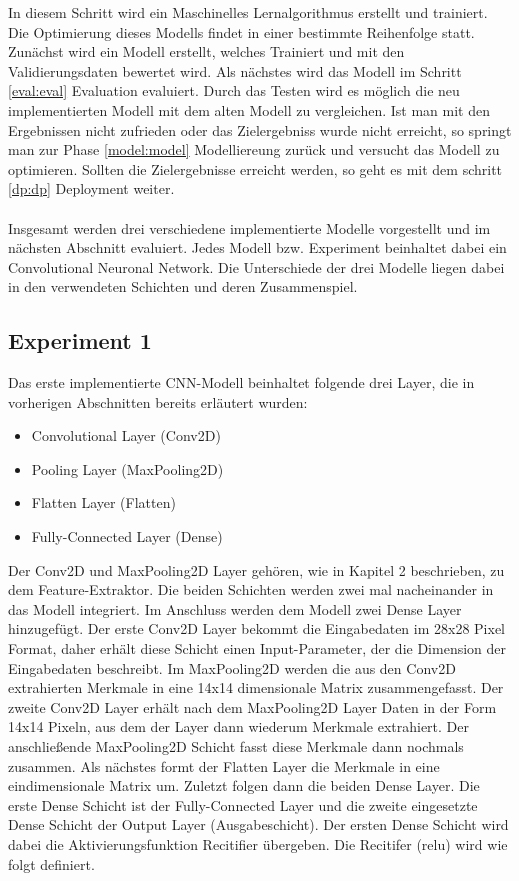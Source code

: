 \documentclass[12pt]{scrreprt}
\begin{document}
In diesem Schritt wird ein Maschinelles Lernalgorithmus erstellt und trainiert. Die Optimierung dieses Modells findet in einer bestimmte Reihenfolge statt. Zunächst wird ein Modell erstellt, welches Trainiert und mit den Validierungsdaten bewertet wird. Als nächstes wird das Modell im Schritt \ref{eval:eval} Evaluation evaluiert. Durch das Testen wird es möglich die neu implementierten Modell mit dem alten Modell zu vergleichen. Ist man mit den Ergebnissen nicht zufrieden oder das Zielergebniss wurde nicht erreicht, so springt man zur Phase \ref{model:model} Modelliereung zurück und versucht das Modell zu optimieren. Sollten die Zielergebnisse erreicht werden, so geht es mit dem schritt \ref{dp:dp} Deployment weiter.\\
\\
Insgesamt werden drei verschiedene implementierte Modelle vorgestellt und im nächsten Abschnitt evaluiert. Jedes Modell bzw. Experiment beinhaltet dabei ein Convolutional Neuronal Network. Die Unterschiede der drei Modelle liegen dabei in den verwendeten Schichten und deren Zusammenspiel. 
	
\subsection{Experiment 1}\label{model:ep1}
	
Das erste implementierte CNN-Modell beinhaltet folgende drei Layer, die in vorherigen Abschnitten bereits erläutert wurden:
	
\begin{itemize}
	\item Convolutional Layer (Conv2D)
	\item Pooling Layer (MaxPooling2D)
	\item Flatten Layer (Flatten)
	\item Fully-Connected Layer (Dense)
	\label{tab:model1}
\end{itemize}
	
Der Conv2D und MaxPooling2D Layer gehören, wie in Kapitel 2 beschrieben, zu dem Feature-Extraktor. Die beiden Schichten werden zwei mal nacheinander in das Modell integriert. Im Anschluss werden dem Modell zwei Dense Layer hinzugefügt. Der erste Conv2D Layer bekommt die Eingabedaten im 28x28 Pixel Format, daher erhält diese Schicht einen Input-Parameter, der die Dimension der Eingabedaten beschreibt. Im MaxPooling2D werden die aus den Conv2D extrahierten Merkmale in eine 14x14 dimensionale Matrix zusammengefasst. Der zweite Conv2D Layer erhält nach dem MaxPooling2D Layer Daten in der Form 14x14 Pixeln, aus dem der Layer dann wiederum Merkmale extrahiert. Der anschließende MaxPooling2D Schicht fasst diese Merkmale dann nochmals zusammen. Als nächstes formt der Flatten Layer die Merkmale in eine eindimensionale Matrix um. Zuletzt folgen dann die beiden Dense Layer. Die erste Dense Schicht ist der Fully-Connected Layer und die zweite eingesetzte Dense Schicht der Output Layer (Ausgabeschicht). Der ersten Dense Schicht wird dabei die Aktivierungsfunktion Recitifier übergeben. Die Recitifer (relu) wird wie folgt definiert.
	
\end{document}
